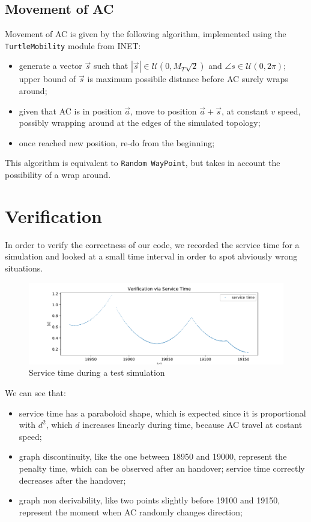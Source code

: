 \documentclass[a4paper,12pt]{article}
\begin{document}
\subsection{Movement of AC}
Movement of AC is given by the following algorithm, implemented using the \texttt{TurtleMobility} module from INET:
\begin{itemize}
  \item generate a vector $\vec{s}$ such that $|\vec{s}| \in \mathcal{U}(0, M_{T}\sqrt{2})$ and $\angle{s} \in \mathcal{U}(0, 2\pi)$; upper bound of $\vec{s}$ is maximum possibile distance before AC surely wraps around;
  \item given that AC is in position $\vec{a}$, move to position $\vec{a} + \vec{s}$, at constant $v$ speed, possibly wrapping around at the edges of the simulated topology;
  \item once reached new position, re-do from the beginning;
\end{itemize}

This algorithm is equivalent to \texttt{Random WayPoint}, but takes in account the possibility of a wrap around.

\section{Verification}
In order to verify the correctness of our code, we recorded the service time for a simulation and looked at a small time interval in order to spot abviously wrong situations.

\begin{figure}[H]
  \centering
  \includegraphics[width=\textwidth]{img/verification-via-service-time.pdf}
  \caption{Service time during a test simulation}
  \label{fig:verification-via-service-time}
\end{figure}

We can see that:
\begin{itemize}
  \item service time has a paraboloid shape, which is expected since it is proportional with $d^2$, which $d$ increases linearly during time, because AC travel at costant speed;
  \item graph discontinuity, like the one between 18950 and 19000, represent the penalty time, which can be observed after an handover; service time correctly decreases after the handover;
  \item graph non derivability, like two points slightly before 19100 and 19150, represent the moment when AC randomly changes direction;
\end{itemize}
\end{document}
